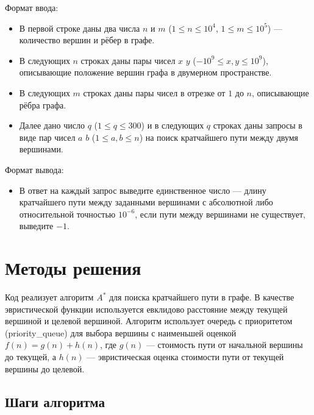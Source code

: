 \documentclass[12pt,a4paper]{article}
\begin{document}
Формат ввода:
\begin{itemize}
    \item В первой строке даны два числа $n$ и $m$ ($1 \le n \le 10^4$, $1 \le m \le 10^5$) — количество вершин и рёбер в графе.
    \item В следующих $n$ строках даны пары чисел $x$ $y$ ($-10^9 \le x, y \le 10^9$), описывающие положение вершин графа в двумерном пространстве.
    \item В следующих $m$ строках даны пары чисел в отрезке от $1$ до $n$, описывающие рёбра графа.
    \item Далее дано число $q$ ($1 \le q \le 300$) и в следующих $q$ строках даны запросы в виде пар чисел $a$ $b$ ($1 \le a, b \le n$) на поиск кратчайшего пути между двумя вершинами.
\end{itemize}

Формат вывода:
\begin{itemize}
    \item В ответ на каждый запрос выведите единственное число — длину кратчайшего пути между заданными вершинами с абсолютной либо относительной точностью $10^{-6}$, если пути между вершинами не существует, выведите $-1$.
\end{itemize}

\section*{Методы решения}

Код реализует алгоритм $A^*$ для поиска кратчайшего пути в графе. В качестве эвристической функции используется евклидово расстояние между текущей вершиной и целевой вершиной. Алгоритм использует очередь с приоритетом (priority\_queue) для выбора вершины с наименьшей оценкой $f(n) = g(n) + h(n)$, где $g(n)$ — стоимость пути от начальной вершины до текущей, а $h(n)$ — эвристическая оценка стоимости пути от текущей вершины до целевой.

\subsection*{Шаги алгоритма}
\end{document}
